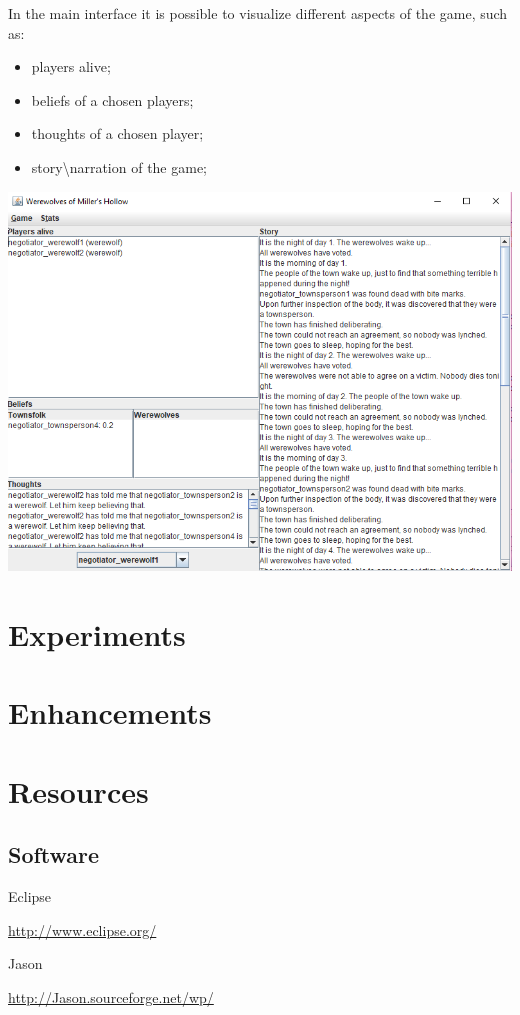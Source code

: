 \documentclass{article}
\begin{document}
In the main interface it is possible to visualize different aspects of the game, such as:
\begin{itemize}
	\item players alive;
	\item beliefs of a chosen players;
	\item thoughts of a chosen player;
	\item story\textbackslash narration of the game;
\end{itemize}
\begin{center}
\includegraphics[width=1\textwidth]{./images/gui.png}\par\vspace{1cm}
\end{center}
\section{Experiments}
\section{Enhancements}
\section{Resources}

\subsection{Software}
Eclipse \par
\url{http://www.eclipse.org/} \par
\vspace{3mm}
Jason \par
\url{http://Jason.sourceforge.net/wp/} \par 
\end{document}
